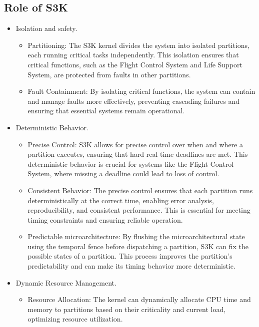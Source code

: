 \subsection{Role of S3K}

\begin{itemize}
	\item Isolation and safety. 

		\begin{itemize}
			\item Partitioning: 
				The S3K kernel divides the system into isolated partitions, each running critical tasks independently. 
				This isolation ensures that critical functions, such as the Flight Control System and Life Support System, are protected from faults in other partitions.
			\item Fault Containment: 
				By isolating critical functions, the system can contain and manage faults more effectively, preventing cascading failures and ensuring that essential systems remain operational.
		\end{itemize}
	\item Deterministic Behavior. 
		\begin{itemize}			
			\item Precise Control: 
				S3K allows for precise control over when and where a partition executes, ensuring that hard real-time deadlines are met. 
				This deterministic behavior is crucial for systems like the Flight Control System, where missing a deadline could lead to loss of control.
			\item Consistent Behavior: 
				The precise control ensures that each partition runs deterministically at the correct time, enabling error analysis, reproducibility, and consistent performance. 
				This is essential for meeting timing constraints and ensuring reliable operation.
			\item Predictable microarchitecture: 
				By flushing the microarchitectural state using the temporal fence before dispatching a partition, S3K can fix the possible states of a partition. 
				This process improves the partition's predictability and can make its timing behavior more deterministic.
		\end{itemize}
	\item Dynamic Resource Management. 
		\begin{itemize}
			\item Resource Allocation: 
				The kernel can dynamically allocate CPU time and memory to partitions based on their criticality and current load, optimizing resource utilization. 

\end{itemize}
\end{itemize}
